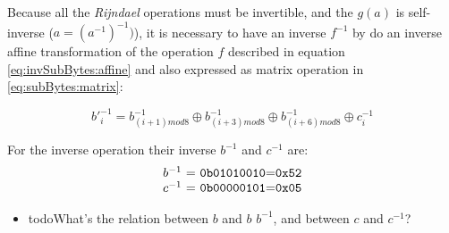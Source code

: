 \documentclass[10pt,a4paper,twoside]{llncs}
\begin{document}
Because all the \emph{Rijndael} operations must be invertible, and the $g(a)$ is self-inverse ($a=(a^{-1})^{-1})$), it is necessary to have an inverse $f^{-1}$ by do an inverse affine transformation of the operation $f$ described in equation \ref{eq:invSubBytes:affine} and also expressed as matrix operation in \ref{eq:subBytes:matrix}:

\begin{equation}\label{eq:invSubBytes:affine}
 b'^{-1}_{i} = b^{-1}_{(i+1)mod8} \oplus b^{-1}_{(i+3)mod8} \oplus 
          b^{-1}_{(i+6)mod8} \oplus c^{-1}_{i}
\end{equation}

For the inverse operation their inverse $b^{-1}$ and $c^{-1}$ are:
\begin{equation}
 \begin{tabular}{c}
  $b^{-1}$ = \texttt{0b01010010}=\texttt{0x52}\\
  $c^{-1}$ = \texttt{0b00000101}=\texttt{0x05}
 \end{tabular}
\end{equation}

\begin{itemize}
 \item todo{What's the relation between $b$ and $b$ $b^{-1}$, and between $c$ and $c^{-1}$?}
\end{itemize}
\end{document}
